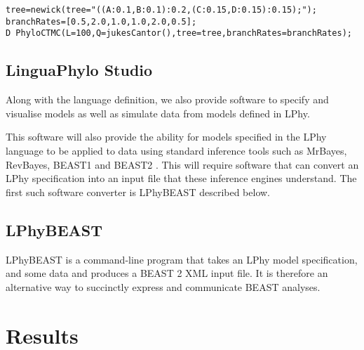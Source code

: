 \documentclass[10pt,letterpaper,table]{article}
\begin{document}
{\begin{alltt}
  tree = newick(tree="((A:0.1,B:0.1):0.2,(C:0.15,D:0.15):0.15);");
  branchRates = [0.5, 2.0, 1.0, 1.0, 2.0, 0.5];
  D ~ PhyloCTMC(L=100, Q=jukesCantor(), tree=tree, branchRates=branchRates);
\end{alltt}

\subsection*{LinguaPhylo Studio}

Along with the language definition, we also provide software to
specify and visualise models as well as simulate data from models
defined in LPhy.

This software will also provide the ability for models specified in
the LPhy language to be applied to data using standard inference tools
such as MrBayes, RevBayes, BEAST1 and BEAST2
\cite{bouckaert2014beastanalysis,DrummondBouckaert2015,bouckaert2019beastanalysis}.
This will require software that can convert an LPhy specification into
an input file that these inference engines understand.
The first such software converter is LPhyBEAST described below.

\subsection*{LPhyBEAST}

LPhyBEAST is a command-line program that takes an LPhy model
specification, and some data and produces a BEAST 2 XML input file.
It is therefore an alternative way to succinctly express and
communicate BEAST analyses.

\section*{Results}

}
\end{document}
